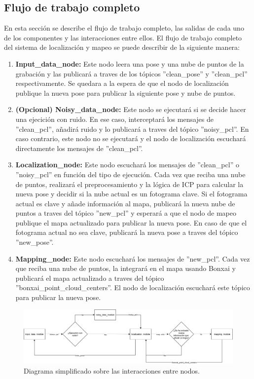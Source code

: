 \documentclass[12pt, a4paper, twoside]{article}
\begin{document}
\subsection{Flujo de trabajo completo}
En esta sección se describe el flujo de trabajo completo, las salidas de cada uno de los componentes y las interacciones entre ellos. El flujo de trabajo completo del sistema de localización 
y mapeo se puede describir de la siguiente manera:

\begin{enumerate}
  \item \textbf{Input\_data\_node:} Este nodo leera una pose y una nube de puntos de la grabación y las publicará a traves de los tópicos 
  ''clean\_pose'' y ''clean\_pcl'' respectivamente. Se quedara a la espera de que el nodo de localización publique la nueva pose para publicar 
  la siguiente pose y nube de puntos.
  \item \textbf{(Opcional) Noisy\_data\_node:} 
  Este nodo se ejecutará si se decide hacer una ejecición con ruido. En ese caso, interceptará los mensajes de ''clean\_pcl'', añadirá ruido y lo publicará a traves del tópico
  ''noisy\_pcl''. En caso contrario, este nodo no se ejecutará y el nodo de localización escuchará directamente los mensajes de ''clean\_pcl''.
  \item \textbf{Localization\_node:} Este nodo escuchará los mensajes de ''clean\_pcl'' o ''noisy\_pcl'' en función del tipo de ejecución. Cada vez que reciba una nube de puntos, 
  realizará el preprocesamiento y la lógica de ICP para calcular la nueva pose y decidir si la nube actual es un fotograma clave. Si el fotograma actual es clave y añade información 
  al mapa, publicará la nueva nube de puntos a traves del tópico ''new\_pcl'' y esperará a que el nodo de mapeo publique el mapa actualizado para publicar la nueva pose.
  En caso de que el fotograma actual no sea clave, publicará la nueva pose a traves del tópico ''new\_pose''.
  \item \textbf{Mapping\_node:} Este nodo escuchará los mensajes de ''new\_pcl''. Cada vez que reciba una nube de puntos, la integrará en el mapa usando Bonxai y publicará el mapa actualizado a traves del tópico
  ''bonxai\_point\_cloud\_centers''. El nodo de localización escuchará este tópico para publicar la nueva pose.
\end{enumerate}

\begin{figure}[h]
  \centering
    \includegraphics[width=1\textwidth]{Diagrama.png}
  \caption{Diagrama simplificado sobre las interacciones entre nodos.}
\end{figure}
\end{document}
